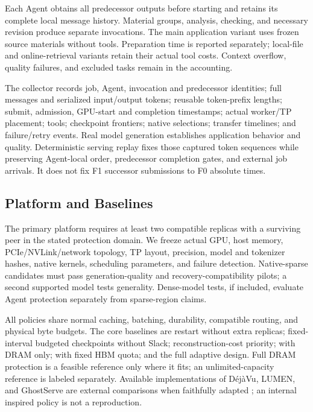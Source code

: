 Each Agent obtains all predecessor outputs before starting and retains its
complete local message history. Material groups, analysis, checking, and
necessary revision produce separate invocations. The main application
variant uses frozen source materials without tools. Preparation time is
reported separately; local-file and online-retrieval variants retain their
actual tool costs. Context overflow, quality failures, and excluded tasks
remain in the accounting.

The collector records job, Agent, invocation and predecessor identities;
full messages and serialized input/output tokens; reusable token-prefix
lengths; submit, admission, GPU-start and completion timestamps; actual
worker/TP placement; tools; checkpoint frontiers; native selections;
transfer timelines; and failure/retry events. Real model generation
establishes application behavior and quality. Deterministic serving replay
fixes those captured token sequences while preserving Agent-local order,
predecessor completion gates, and external job arrivals. It does not fix
F1 successor submissions to F0 absolute times.

\subsection{Platform and Baselines}\label{sec:eval-setup}

The primary platform requires at least two compatible replicas with a
surviving peer in the stated protection domain. We freeze actual GPU,
host memory, PCIe/NVLink/network topology, TP layout, precision, model and
tokenizer hashes, native kernels, scheduling parameters, and failure
detection. Native-sparse candidates must pass generation-quality and
recovery-compatibility pilots; a second supported model tests generality.
Dense-model tests, if included, evaluate Agent protection separately from
sparse-region claims.

All policies share normal caching, batching, durability, compatible
routing, and physical byte budgets. The core baselines are restart without
extra replicas; fixed-interval budgeted checkpoints without Slack;
reconstruction-cost priority; \system with DRAM only; \system with fixed
HBM quota; and the full adaptive design. Full DRAM protection is a feasible
reference only where it fits; an unlimited-capacity reference is labeled
separately. Available implementations of
D\'ej\`aVu, LUMEN, and GhostServe are external comparisons when faithfully
adapted \cite{strati2024dejavu,cao2026lumen,jayakody2026ghostserve};
an internal inspired policy is not a reproduction.

